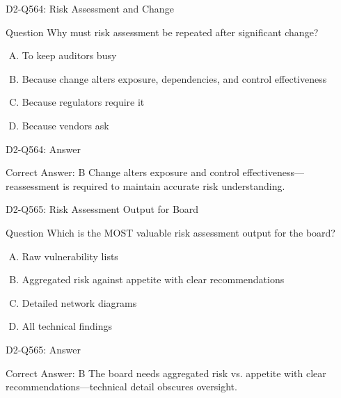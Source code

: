 \documentclass{beamer}
\begin{document}
	\begin{frame}{D2-Q564: Risk Assessment and Change}
		\begin{block}{Question}
			Why must risk assessment be repeated after significant change?
		\end{block}
		\begin{enumerate}[(A)]
			\item To keep auditors busy
			\item Because change alters exposure, dependencies, and control effectiveness
			\item Because regulators require it
			\item Because vendors ask
		\end{enumerate}
	\end{frame}
	\begin{frame}{D2-Q564: Answer}
		\begin{block}{Correct Answer: B}
			Change alters exposure and control effectiveness—reassessment is required to maintain accurate risk understanding.
		\end{block}
	\end{frame}
	
	\begin{frame}{D2-Q565: Risk Assessment Output for Board}
		\begin{block}{Question}
			Which is the MOST valuable risk assessment output for the board?
		\end{block}
		\begin{enumerate}[(A)]
			\item Raw vulnerability lists
			\item Aggregated risk against appetite with clear recommendations
			\item Detailed network diagrams
			\item All technical findings
		\end{enumerate}
	\end{frame}
	\begin{frame}{D2-Q565: Answer}
		\begin{block}{Correct Answer: B}
			The board needs aggregated risk vs. appetite with clear recommendations—technical detail obscures oversight.
		\end{block}
	\end{frame}
	
\end{document}
